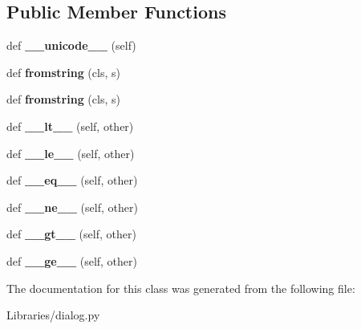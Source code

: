 \subsection*{Public Member Functions}
\begin{DoxyCompactItemize}
\item 
def {\bfseries \+\_\+\+\_\+unicode\+\_\+\+\_\+} (self)\hypertarget{class_libraries_1_1dialog_1_1_backend_version_a7498b281f518ddbb2f1490f9b5bf356d}{}\label{class_libraries_1_1dialog_1_1_backend_version_a7498b281f518ddbb2f1490f9b5bf356d}

\item 
def {\bfseries fromstring} (cls, s)\hypertarget{class_libraries_1_1dialog_1_1_backend_version_a8cf40dcb7e60e4ac1ee3868c57da71a6}{}\label{class_libraries_1_1dialog_1_1_backend_version_a8cf40dcb7e60e4ac1ee3868c57da71a6}

\item 
def {\bfseries fromstring} (cls, s)\hypertarget{class_libraries_1_1dialog_1_1_backend_version_a8cf40dcb7e60e4ac1ee3868c57da71a6}{}\label{class_libraries_1_1dialog_1_1_backend_version_a8cf40dcb7e60e4ac1ee3868c57da71a6}

\item 
def {\bfseries \+\_\+\+\_\+lt\+\_\+\+\_\+} (self, other)\hypertarget{class_libraries_1_1dialog_1_1_backend_version_a5c81e30b97781c1107ccc20d0d22ec3b}{}\label{class_libraries_1_1dialog_1_1_backend_version_a5c81e30b97781c1107ccc20d0d22ec3b}

\item 
def {\bfseries \+\_\+\+\_\+le\+\_\+\+\_\+} (self, other)\hypertarget{class_libraries_1_1dialog_1_1_backend_version_ab7086e48b46b0fc9bbd7368950307191}{}\label{class_libraries_1_1dialog_1_1_backend_version_ab7086e48b46b0fc9bbd7368950307191}

\item 
def {\bfseries \+\_\+\+\_\+eq\+\_\+\+\_\+} (self, other)\hypertarget{class_libraries_1_1dialog_1_1_backend_version_abbd6ce9c6c1b144f6115c17dc6278c4b}{}\label{class_libraries_1_1dialog_1_1_backend_version_abbd6ce9c6c1b144f6115c17dc6278c4b}

\item 
def {\bfseries \+\_\+\+\_\+ne\+\_\+\+\_\+} (self, other)\hypertarget{class_libraries_1_1dialog_1_1_backend_version_a92c32c3e75067cb3075c747f01ad5d50}{}\label{class_libraries_1_1dialog_1_1_backend_version_a92c32c3e75067cb3075c747f01ad5d50}

\item 
def {\bfseries \+\_\+\+\_\+gt\+\_\+\+\_\+} (self, other)\hypertarget{class_libraries_1_1dialog_1_1_backend_version_af35265515d54a60dd8cbedc63c5df9eb}{}\label{class_libraries_1_1dialog_1_1_backend_version_af35265515d54a60dd8cbedc63c5df9eb}

\item 
def {\bfseries \+\_\+\+\_\+ge\+\_\+\+\_\+} (self, other)\hypertarget{class_libraries_1_1dialog_1_1_backend_version_aadca51358999424c31d9b7a0876c32e8}{}\label{class_libraries_1_1dialog_1_1_backend_version_aadca51358999424c31d9b7a0876c32e8}

\end{DoxyCompactItemize}


The documentation for this class was generated from the following file\+:\begin{DoxyCompactItemize}
\item 
Libraries/dialog.\+py\end{DoxyCompactItemize}
